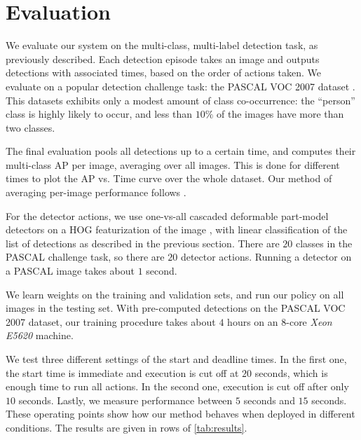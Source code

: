 \section{Evaluation}\label{sec:det_evaluation}

We evaluate our system on the multi-class, multi-label detection task, as previously described.
Each detection episode takes an image and outputs detections with associated times, based on the order of actions taken.
We evaluate on a popular detection challenge task: the PASCAL VOC 2007 dataset \parencite{pascal-voc-2010}.
This datasets exhibits only a modest amount of class co-occurrence: the ``person'' class is highly likely to occur, and less than $10\%$ of the images have more than two classes.

The final evaluation pools all detections up to a certain time, and computes their multi-class AP per image, averaging over all images.
This is done for different times to plot the AP vs. Time curve over the whole dataset.
Our method of averaging per-image performance follows \parencite{Desai2009}.

For the detector actions, we use one-vs-all cascaded deformable part-model detectors on a HOG featurization of the image \parencite{Felzenszwalb-CVPR-2010}, with linear classification of the list of detections as described in the previous section.
There are $20$ classes in the PASCAL challenge task, so there are $20$ detector actions.
Running a detector on a PASCAL image takes about $1$ second.

We learn weights on the training and validation sets, and run our policy on all images in the testing set.
With pre-computed detections on the PASCAL VOC 2007 dataset, our training procedure takes about $4$ hours on an $8$-core \emph{Xeon E5620} machine.

We test three different settings of the start and deadline times.
In the first one, the start time is immediate and execution is cut off at $20$ seconds, which is enough time to run all actions.
In the second one, execution is cut off after only $10$ seconds.
Lastly, we measure performance between $5$ seconds and $15$ seconds.
These operating points show how our method behaves when deployed in different conditions.
The results are given in rows of \autoref{tab:results}.



